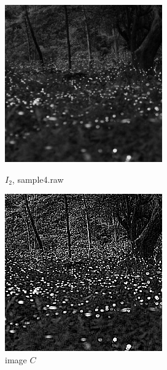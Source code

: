\documentclass[12pt,a4paper,notitlepage,oneside,amsmath,amssymb]{article}
\begin{document}
\begin{CJK*}{UTF8}{bkai}
\begin{enumerate}[label=(\alph*)]
		      \begin{figure}[hbt!]
			      \centering
			      \begin{minipage}{.4\textwidth}
				      \centering
				      \includegraphics[width=.8\linewidth]{sample4}
				      \caption*{\(I_2\), sample4.raw}
			      \end{minipage}%
			      \begin{minipage}{.4\textwidth}
				      \centering
				      \includegraphics[width=.8\linewidth]{image_C}
				      \caption*{image \(C\)}
			      \end{minipage}
		      \end{figure}


\end{enumerate}
\end{CJK*}
\end{document}
